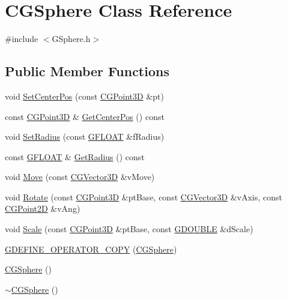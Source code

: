 \hypertarget{class_c_g_sphere}{}\section{C\+G\+Sphere Class Reference}
\label{class_c_g_sphere}


{\ttfamily \#include $<$G\+Sphere.\+h$>$}

\subsection*{Public Member Functions}
\begin{DoxyCompactItemize}
\item 
void \hyperlink{class_c_g_sphere_a25322b07ae55afbdb04e13547afdebb5}{Set\+Center\+Pos} (const \hyperlink{class_c_g_point3_d}{C\+G\+Point3\+D} \&pt)
\item 
const \hyperlink{class_c_g_point3_d}{C\+G\+Point3\+D} \& \hyperlink{class_c_g_sphere_a7f8de616dbf36f8740c2d076ef4751ed}{Get\+Center\+Pos} () const 
\item 
void \hyperlink{class_c_g_sphere_a015c6a477aa9d23fe74645764f28586a}{Set\+Radius} (const \hyperlink{_g_types_8h_abf6eba8223df62f199b811a6c52ff2ef}{G\+F\+L\+O\+A\+T} \&f\+Radius)
\item 
const \hyperlink{_g_types_8h_abf6eba8223df62f199b811a6c52ff2ef}{G\+F\+L\+O\+A\+T} \& \hyperlink{class_c_g_sphere_a6d38747587983bb085458fb23c8dff00}{Get\+Radius} () const 
\item 
void \hyperlink{class_c_g_sphere_a4e49a00658ae389eb849498864a60452}{Move} (const \hyperlink{_g_point3_d_8h_aa7e73d39f4c991acb5a13c84b498366d}{C\+G\+Vector3\+D} \&v\+Move)
\item 
void \hyperlink{class_c_g_sphere_aec106f2f7daf598e3f630c37faeb322e}{Rotate} (const \hyperlink{class_c_g_point3_d}{C\+G\+Point3\+D} \&pt\+Base, const \hyperlink{_g_point3_d_8h_aa7e73d39f4c991acb5a13c84b498366d}{C\+G\+Vector3\+D} \&v\+Axis, const \hyperlink{class_c_g_point2_d}{C\+G\+Point2\+D} \&v\+Ang)
\item 
void \hyperlink{class_c_g_sphere_ac9e96f0da66fe0aa1942528c71ba2178}{Scale} (const \hyperlink{class_c_g_point3_d}{C\+G\+Point3\+D} \&pt\+Base, const \hyperlink{_g_types_8h_afd05ac85f90ee8e2a733928545462cd4}{G\+D\+O\+U\+B\+L\+E} \&d\+Scale)
\item 
\hyperlink{class_c_g_sphere_a741609e61f2b3e2ff0d20eaba25c73cf}{G\+D\+E\+F\+I\+N\+E\+\_\+\+O\+P\+E\+R\+A\+T\+O\+R\+\_\+\+C\+O\+P\+Y} (\hyperlink{class_c_g_sphere}{C\+G\+Sphere})
\item 
\hyperlink{class_c_g_sphere_ace7f04f020666a489208280b9c2446a0}{C\+G\+Sphere} ()
\item 
\hyperlink{class_c_g_sphere_a8705a5722589eedc71684f1154a20f98}{$\sim$\+C\+G\+Sphere} ()
\end{DoxyCompactItemize}


